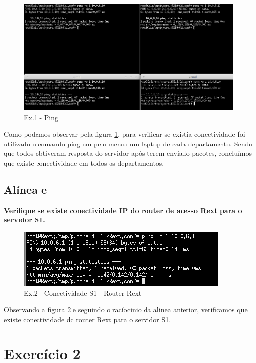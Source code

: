 \documentclass[a4paper]{report}
\begin{document}
\begin{figure}[H]
    \centering 
    \includegraphics[width=\textwidth]{images/pingEx1P2.png}
    \caption{Ex.1 - Ping}
    \label{fig:pingEx1P2}
\end{figure}
Como podemos observar pela figura \ref{fig:pingEx1P2}, para verificar se existia
conectividade foi utilizado o comando ping em pelo menos um laptop de cada departamento.
Sendo que todos obtiveram resposta do servidor após terem enviado pacotes, concluímos
que existe conectividade em todos os departamentos.

\subsection{Alínea e}
\textbf{Verifique se existe conectividade IP do router de acesso Rext para o servidor S1.}\\

\begin{figure}[H]
    \centering 
    \includegraphics[width=\textwidth]{images/RextPing.png}
    \caption{Ex.2 - Conectividade S1 - Router Rext}
    \label{fig:RextPing}
\end{figure}
Observando a figura \ref{fig:RextPing} e seguindo o racíocinio da alinea anterior,
verificamos que existe conectividade do router Rext para o servidor S1.

\section{Exercício 2}
\end{document}

